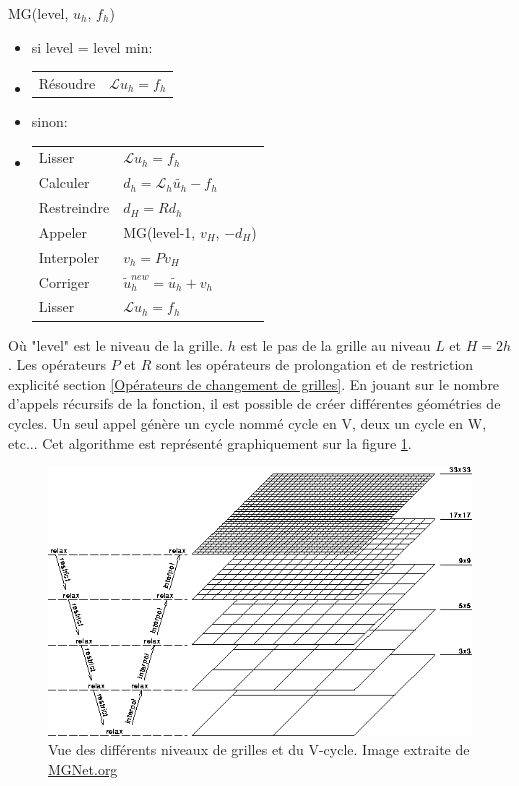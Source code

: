 MG(level, $u_h$, $f_h$)
\begin{itemize}	
\item 	si level = level min:
\item[]	\begin{tabular}{ll}
		Résoudre & $\mathcal{L} u_h = f_h $
		\end{tabular}
\item 	sinon:
\item[]	\begin{tabular}{ll}
		Lisser 		& 	$ \mathcal{L} u_h = f_h $\\
		Calculer	&	$ d_h = \mathcal{L}_h \tilde{u_h} - f_h $\\
		Restreindre	&	$ d_H = Rd_h$\\
		Appeler 	&	MG(level-1, $v_H$, $-d_H$) \\
		Interpoler	&	$ v_h = Pv_H$\\
		Corriger	&	$ \tilde{u}_h^{new} = \tilde{u_h} + v_h$\\
		Lisser		&	$ \mathcal{L} u_h = f_h $
		\end{tabular} 
\end{itemize}

Où "level" est le niveau de la grille. $h$ est le pas de la grille au niveau $L$ et $H = 2h$. 
Les opérateurs $P$ et $R$ sont les opérateurs de prolongation et de restriction explicité section \ref{Opérateurs de changement de grilles}.
En jouant sur le nombre d'appels récursifs de la fonction, il est possible de créer différentes géométries de cycles. 
Un seul appel génère un cycle nommé cycle en V, deux un cycle en W, etc... 
Cet algorithme est représenté graphiquement sur la figure \ref{fig:mgrid}.

\begin{figure}
\begin{center}
\includegraphics[scale=0.35]{img/02/multigrid.png}
\caption[Multigrille]{Vue des différents niveaux de grilles et du V-cycle.
 Image extraite de \href{http://MGNet.org}{MGNet.org} }
\label{fig:mgrid}
\end{center}
\end{figure}	

